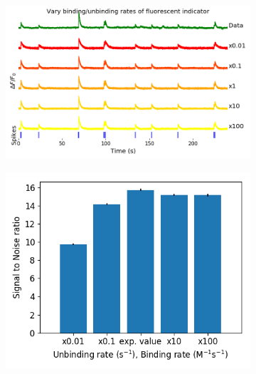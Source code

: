 \documentclass[a4paper,12pt]{article}
\theoremstyle{definition}
\begin{document}
\begin{figure}[p]
\centering
    \begin{subfigure}{0.8\textwidth}
        \includegraphics[width=\linewidth]{figures/b_i_f_i_perturbed_fluorescence_18_paper.png}
        \caption{}
    \end{subfigure}
    \newline
    \begin{subfigure}{0.4\textwidth}
        \includegraphics[width=\linewidth]{figures/b_i_f_i_perturbed_snr.png}
        \caption{}
    \end{subfigure}
    \begin{subfigure}{0.4\textwidth}

\end{subfigure}
\end{figure}
\end{document}
